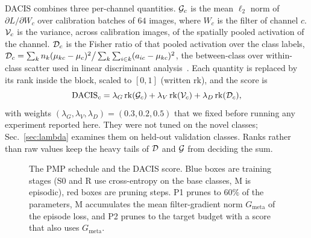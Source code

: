 DACIS combines three per-channel quantities. $\mathcal{G}_c$ is the mean $\ell_2$ norm of $\partial L/\partial W_c$ over calibration batches of $64$ images, where $W_c$ is the filter of channel $c$. $\mathcal{V}_c$ is the variance, across calibration images, of the spatially pooled activation of the channel. $\mathcal{D}_c$ is the Fisher ratio of that pooled activation over the class labels, $\mathcal{D}_c=\sum_k n_k(\mu_{kc}-\mu_c)^2\big/\sum_k\sum_{i\in k}(a_{ic}-\mu_{kc})^2$, the between-class over within-class scatter used in linear discriminant analysis~\cite{fisher1936}. Each quantity is replaced by its rank inside the block, scaled to $[0,1]$ (written $\mathrm{rk}$), and the score is
\begin{equation}
  \mathrm{DACIS}_c=\lambda_G\,\mathrm{rk}(\mathcal{G}_c)+\lambda_V\,\mathrm{rk}(\mathcal{V}_c)+\lambda_D\,\mathrm{rk}(\mathcal{D}_c),
  \label{eq:dacis}
\end{equation}
with weights $(\lambda_G,\lambda_V,\lambda_D)=(0.3,0.2,0.5)$ that we fixed before running any experiment reported here. They were not tuned on the novel classes; Sec.~\ref{sec:lambda} examines them on held-out validation classes. Ranks rather than raw values keep the heavy tails of $\mathcal{D}$ and $\mathcal{G}$ from deciding the sum.

\begin{figure}[t]
  \centering
  
  \caption{The PMP schedule and the DACIS score. Blue boxes are training stages (S0 and R use cross-entropy on the base classes, M is episodic), red boxes are pruning steps. P1 prunes to $60\%$ of the parameters, M accumulates the mean filter-gradient norm $G_{\mathrm{meta}}$ of the episode loss, and P2 prunes to the target budget with a score that also uses $G_{\mathrm{meta}}$.}
  \label{fig:overview}
\end{figure}


